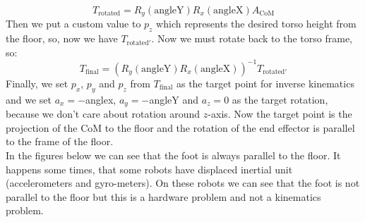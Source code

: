 \[
	T_{\text{rotated}} = R_y(\text{angleY})R_x(\text{angleX})A_{\text{CoM}}
\]
Then we put a custom value to \(p_z\) which represents the desired torso height from the floor, so, now we have \(T_{\text{rotated}'}\). Now we must rotate back to the torso frame, so:
\[
	T_{\text{final}} = \left(R_y(\text{angleY})R_x(\text{angleX})\right)^{-1}T_{\text{rotated}'}
\]
Finally, we set  \(p_x\), \(p_y\) and \(p_z\) from \(T_{\text{final}}\) as the target point for inverse kinematics and we set \(a_x = -\)anglex, \(a_y = -\)angleY and \(a_z = 0\) as the target rotation, because we don't care about rotation around \(z\)-axis. Now the target point is the projection of the CoM to the floor and the rotation of the end effector is parallel to the frame of the floor.\\
In the figures below we can see that the foot is always parallel to the floor. It happens some times, that some robots have displaced inertial unit (accelerometers and gyro-meters). On these robots we can see that the foot is not parallel to the floor but this is a hardware problem and not a kinematics problem.
